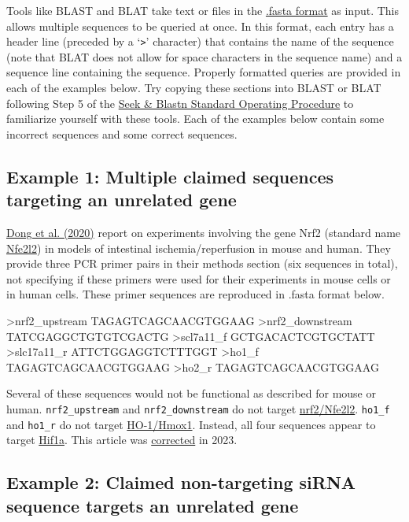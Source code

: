 \documentclass[letterpaper, 12pt]{article}
\begin{document}
Tools like BLAST and BLAT take text or files in the \href{https://en.wikipedia.org/wiki/FASTA_format}{.fasta format} as input. This allows multiple sequences to be queried at once. In this format, each entry has a header line (preceded by a `\verb|>|' character) that contains the name of the sequence (note that BLAT does not allow for space characters in the sequence name) and a sequence line containing the sequence. Properly formatted queries are provided in each of the examples below. Try copying these sections into BLAST or BLAT following Step 5 of the \href{https://dx.doi.org/10.17504/protocols.io.bjhpkj5n}{Seek \& Blastn Standard Operating Procedure} to familiarize yourself with these tools. Each of the examples below contain some incorrect sequences and some correct sequences.

\pagebreak

\subsection*{Example 1: Multiple claimed sequences targeting an unrelated gene}

\href{https://doi.org/10.18632/aging.103378}{Dong et al. (2020)} report on experiments involving the gene Nrf2 (standard name \href{https://www.ncbi.nlm.nih.gov/gene/18024}{Nfe2l2}) in models of intestinal ischemia/reperfusion in mouse and human. They provide three PCR primer pairs in their methods section (six sequences in total), not specifying if these primers were used for their experiments in mouse cells or in human cells. These primer sequences are reproduced in .fasta format below.

\begin{verbatim*}
>nrf2_upstream
TAGAGTCAGCAACGTGGAAG
>nrf2_downstream
TATCGAGGCTGTGTCGACTG
>scl7a11_f
GCTGACACTCGTGCTATT
>slc17a11_r
ATTCTGGAGGTCTTTGGT
>ho1_f
TAGAGTCAGCAACGTGGAAG
>ho2_r
TAGAGTCAGCAACGTGGAAG
\end{verbatim*}

Several of these sequences would not be functional as described for mouse or human. \verb|nrf2_upstream| and \verb|nrf2_downstream| do not target \href{https://www.ncbi.nlm.nih.gov/gene/18024}{nrf2/Nfe2l2}. \verb|ho1_f| and \verb|ho1_r| do not target \href{https://www.ncbi.nlm.nih.gov/gene/15368}{HO-1/Hmox1}. Instead, all four sequences appear to target \href{https://www.ncbi.nlm.nih.gov/gene/15251}{Hif1a}. This article was \href{https://doi.org/10.18632/aging.205167}{corrected} in 2023.

\subsection*{Example 2: Claimed non-targeting siRNA sequence targets an unrelated gene}
\end{document}
